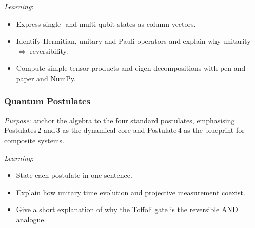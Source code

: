 \emph{Learning}:
\begin{itemize}
	\item Express single- and multi-qubit states as column vectors.

	\item Identify Hermitian, unitary and Pauli operators and explain why unitarity $\iff$ reversibility.

	\item Compute simple tensor products and eigen-decompositions with pen-and-paper and NumPy.
\end{itemize}




\subsubsection{Quantum Postulates}

\emph{Purpose}: anchor the algebra to the four standard postulates, 
emphasising Postulates 2 and 3 as the dynamical core and Postulate 4 as the blueprint for composite systems.

\emph{Learning}:
\begin{itemize}
	\item State each postulate in one sentence.
	\item Explain how unitary time evolution and projective measurement coexist.
	\item Give a short explanation of why the Toffoli gate is the reversible AND analogue.
\end{itemize}

	

